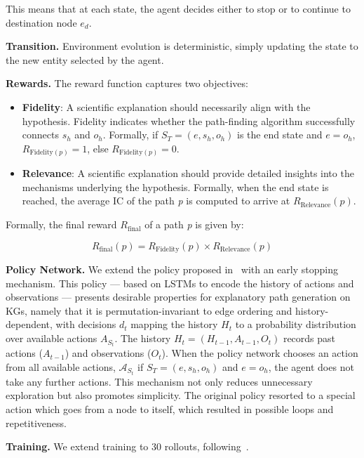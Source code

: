 \documentclass{article}
\theoremstyle{definition}
\begin{document}
This means that at each state, the agent decides either to stop or to continue to destination node $e_d$.

\textbf{Transition.} Environment evolution is deterministic, simply updating the state to the new entity selected by the agent.

\textbf{Rewards.} The reward function captures two objectives: 
\begin{itemize}


\item \textbf{Fidelity}: A scientific explanation should necessarily align with the hypothesis. Fidelity indicates whether the path-finding algorithm successfully connects $s_h$ and $o_h$. Formally, if $S_T = (e, s_h, o_h)$ is the end state and $e=o_h$, $R_{\text{Fidelity}(p)}=1$, else $R_{\text{Fidelity}(p)}=0$.


\item \textbf{Relevance}: A scientific explanation should provide detailed insights into the mechanisms underlying the hypothesis. Formally, when the end state is reached, the average IC of the path \textit{p} is computed to arrive at $R_{\text{Relevance}}(p)$. 
\end{itemize}

Formally, the final reward \( R_{\text{final}} \) of a path \textit{p} is given by:  

\[
R_{\text{final}}(p) =  R_{\text{Fidelity}}(p) \times R_{\text{Relevance}}(p)
\]  

\textbf{Policy Network.} We extend the policy proposed in~\cite{das2017minerva} with an early stopping mechanism. This policy --- based on LSTMs to encode the history of actions and observations --- presents desirable properties for explanatory path generation on KGs, namely that it is permutation-invariant to edge ordering and history-dependent, with decisions \(d_t\) mapping the history \(H_t\) to a probability distribution over available actions \(A_{S_t}\). 
The history \(H_t = (H_{t-1}, A_{t-1}, O_t)\) records past actions (\(A_{t-1}\)) and observations (\(O_t\)). When the policy network chooses an action from all available actions, $\mathcal{A}_{S_t}$
 if $S_T = (e, s_h, o_h)$ and $e=o_h$, the agent does not take any further actions. This mechanism not only reduces unnecessary exploration but also promotes simplicity. The original policy resorted to a special action which goes from a node to itself, which resulted in possible loops and repetitiveness.

\textbf{Training.} We extend training to 30 rollouts, following~\cite{liu2021neural}.
    
\end{document}
